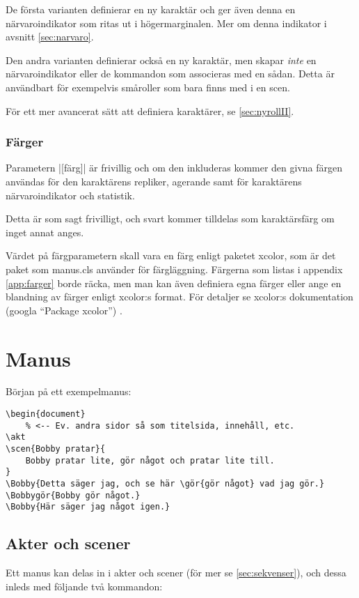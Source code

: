 \documentclass[a4paper,12pt]{article}
\newcommand*{\pack}{\textsf}
\begin{document}
De första varianten definierar en ny karaktär och ger även denna en närvaroindikator som ritas ut i högermarginalen. Mer om denna indikator i avsnitt \ref{sec:narvaro}.

Den andra varianten definierar också en ny karaktär, men skapar \emph{inte} en närvaroindikator eller de kommandon som associeras med en sådan. Detta är användbart för exempelvis småroller som bara finns med i en scen.

För ett mer avancerat sätt att definiera karaktärer, se \ref{sec:nyrollII}.

\subsubsection{Färger}
\label{sec:farger}
Parametern |[färg]| är frivillig och om den inkluderas kommer den givna färgen användas för den karaktärens repliker, agerande samt för karaktärens närvaroindikator och statistik.

Detta är som sagt frivilligt, och svart kommer tilldelas som karaktärsfärg om inget annat anges. 

Värdet på färgparametern skall vara en färg enligt paketet \pack{xcolor}, som är det paket som \pack{manus.cls} använder för färgläggning. Färgerna som listas i appendix \ref{app:farger} borde räcka, men man kan även definiera egna färger eller ange en blandning av färger enligt \pack{xcolor}:s format. För detaljer se \pack{xcolor}:s dokumentation (googla ``Package xcolor'') .



\needspace{5em}
\section{Manus}
Början på ett exempelmanus:

\begin{lstlisting}
\begin{document}
	% <-- Ev. andra sidor så som titelsida, innehåll, etc.
\akt
\scen{Bobby pratar}{
	Bobby pratar lite, gör något och pratar lite till.
}
\Bobby{Detta säger jag, och se här \gör{gör något} vad jag gör.}
\Bobbygör{Bobby gör något.}
\Bobby{Här säger jag något igen.}
\end{lstlisting}



\subsection{Akter och scener}
Ett manus kan delas in i akter och scener (för mer se \ref{sec:sekvenser}), och dessa inleds med följande två kommandon:
\end{document}
